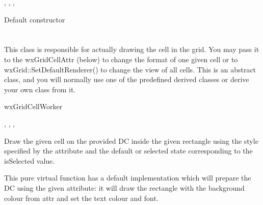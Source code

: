 ,\rtfsp
{},\rtfsp
{},\rtfsp
{}


\label{wxgridcellnumberrendererconstr}


Default constructor

\section{}\label{wxgridcellrenderer}

This class is responsible for actually drawing the cell
in the grid. You may pass it to the wxGridCellAttr (below) to change the
format of one given cell or to wxGrid::SetDefaultRenderer() to change the
view of all cells. This is an abstract class, and you will normally use one of the
predefined derived classes or derive your own class from it.


wxGridCellWorker


,\rtfsp
{},\rtfsp
{},\rtfsp
{}


\label{wxgridcellrendererdraw}


Draw the given cell on the provided DC inside the given rectangle
using the style specified by the attribute and the default or selected
state corresponding to the isSelected value.

This pure virtual function has a default implementation which will
prepare the DC using the given attribute: it will draw the rectangle
with the background colour from attr and set the text colour and font.

